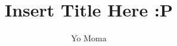 \documentclass[11pt]{article}
\begin{document}
\title{Insert Title Here :P} 
\author{Yo Moma}
\maketitle
\thispagestyle{empty}
\newpage


\newpage

\newpage

\newpage

\newpage

\newpage

\newpage



\end{document}
